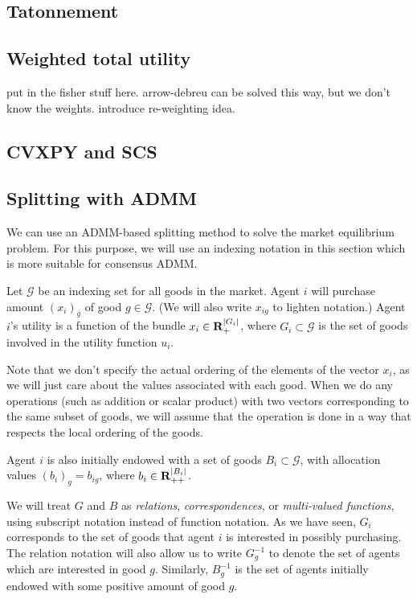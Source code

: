 \documentclass{article}
\begin{document}
\subsection{Tatonnement}

\subsection{Weighted total utility}
put in the fisher stuff here. arrow-debreu can be solved this way, but we
don't know the weights. introduce re-weighting idea.

\subsection{CVXPY and SCS}

\subsection{Splitting with ADMM}
We can use an ADMM-based splitting method \cite{boyd2011distributed} to
solve the market equilibrium problem.
For this purpose, we will use an indexing notation in this section which is
more suitable for consensus ADMM.

Let $\mathcal{G}$ be an indexing set for all goods
in the market.
Agent $i$ will purchase amount $(x_i)_g$ of good $g \in \mathcal{G}$.
(We will also write $x_{ig}$ to lighten notation.)
Agent $i$'s utility is a function of the bundle $x_i \in {\mbox{\bf R}}_{+}^{|G_i|}$,
where $G_i \subset \mathcal{G}$ is the set of goods involved in the utility
function $u_i$.

Note that we don't specify the actual ordering of the elements
of the vector $x_i$, as we will just care about the values associated with
each good.
When we do any operations (such as addition or scalar product) with
two vectors corresponding to the same subset of goods, we will
assume that the operation is done in a way that respects the local ordering of
the goods.

Agent $i$ is also initially endowed with a set of goods $B_i \subset \mathcal{G}$,
with allocation values $(b_i)_g = b_{ig}$, where $b_i \in {\mbox{\bf R}}_{++}^{|B_i|}$.

We will treat $G$ and $B$ as \emph{relations}, \emph{correspondences}, or
\emph{multi-valued functions},
using subscript notation instead of function notation.
As we have seen, $G_i$ corresponds to the set of goods that agent $i$ is interested
in possibly purchasing.
The relation notation will also allow us to
write $G^{-1}_g$ to denote the set of agents which are interested in good
$g$.
Similarly, $B^{-1}_g$ is the set of agents initially endowed with some
positive amount of good $g$.
\end{document}
